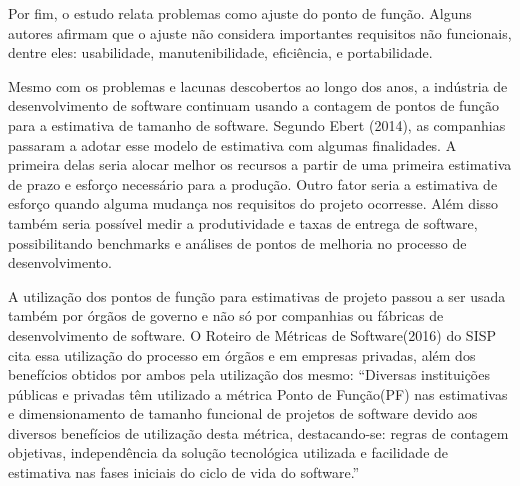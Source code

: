 Por fim, o estudo relata problemas como ajuste do ponto de função. Alguns autores afirmam que o ajuste não considera  importantes requisitos não funcionais, dentre eles: usabilidade, manutenibilidade, eficiência, e portabilidade.

Mesmo com os problemas e lacunas descobertos ao longo dos anos, a indústria de desenvolvimento de software continuam usando a contagem de pontos de função para a estimativa de tamanho de software. Segundo Ebert (2014), as companhias passaram a adotar esse modelo de estimativa com algumas finalidades. A primeira delas seria alocar melhor os recursos a partir de uma primeira estimativa de prazo e esforço necessário para a produção. Outro fator seria a estimativa de esforço quando alguma mudança nos requisitos do projeto ocorresse. Além disso também seria possível medir a produtividade e taxas de entrega de software, possibilitando benchmarks  e análises de pontos de melhoria no processo de desenvolvimento.

A utilização dos pontos de função para estimativas de projeto passou a ser usada também por órgãos de governo e não só por companhias ou fábricas de desenvolvimento de software. O Roteiro de Métricas de Software(2016) do SISP cita essa utilização do processo em órgãos e em empresas privadas, além dos benefícios obtidos por ambos pela utilização dos mesmo:  “Diversas instituições públicas e privadas têm utilizado a métrica Ponto de Função(PF) nas estimativas e dimensionamento de tamanho funcional de projetos de software devido aos diversos benefícios de utilização desta métrica, destacando-se: regras de contagem objetivas, independência da solução tecnológica utilizada e facilidade de estimativa nas fases iniciais do ciclo de vida do software.”
